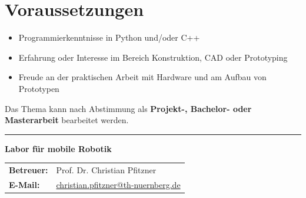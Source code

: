 \documentclass{ohm_project_description}
\begin{document}
\section*{Voraussetzungen}
\begin{itemize}[leftmargin=0.5cm]
    \setlength\itemsep{.1em}
    \item Programmierkenntnisse in Python und/oder C++
    \item Erfahrung oder Interesse im Bereich Konstruktion, CAD oder Prototyping
    \item Freude an der praktischen Arbeit mit Hardware und am Aufbau von Prototypen
\end{itemize}

\vspace{0.5cm}
Das Thema kann nach Abstimmung als \textbf{Projekt-, Bachelor- oder Masterarbeit} bearbeitet werden.

\vfill
\textcolor{ohm_red}{\rule{\linewidth}{0.4mm}}
\textbf{\textcolor{ohm_red}{Labor für mobile Robotik}} \\
\begin{tabular}{@{}ll}
\textbf{Betreuer:} & Prof. Dr. Christian Pfitzner \\
\textbf{E-Mail:}   & \href{mailto:christian.pfitzner@th-nuernberg.de}{christian.pfitzner@th-nuernberg.de} \\
\end{tabular}
\end{document}
